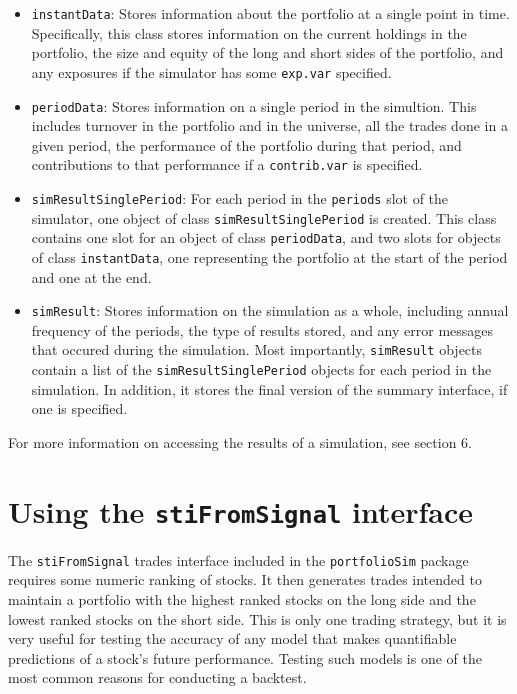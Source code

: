 \documentclass{article}
\begin{document}
\begin{itemize}

\item{\texttt{instantData}}: Stores information about the portfolio at
a single point in time.  Specifically, this class stores information
on the current holdings in the portfolio, the size and equity of the
long and short sides of the portfolio, and any exposures if the
simulator has some \texttt{exp.var} specified.

\item{\texttt{periodData}}: Stores information on a single period in
the simultion.  This includes turnover in the portfolio and in the
universe, all the trades done in a given period, the performance of
the portfolio during that period, and contributions to that
performance if a \texttt{contrib.var} is specified.

\item{\texttt{simResultSinglePeriod}}: For each period in the
\texttt{periods} slot of the simulator, one object of class
\texttt{simResultSinglePeriod} is created.  This class contains one
slot for an object of class \texttt{periodData}, and two slots for
objects of class \texttt{instantData}, one representing the portfolio
at the start of the period and one at the end.

\item{\texttt{simResult}}: Stores information on the simulation as a
whole, including annual frequency of the periods, the type of results
stored, and any error messages that occured during the simulation.
Most importantly, \texttt{simResult} objects contain a list of the
\texttt{simResultSinglePeriod} objects for each period in the
simulation.  In addition, it stores the final version of the summary
interface, if one is specified.

\end{itemize}

For more information on accessing the results of a simulation, see
section 6.


\section{Using the \texttt{stiFromSignal} interface}

The \texttt{stiFromSignal} trades interface included in the
\texttt{portfolioSim} package requires some numeric ranking of stocks.
It then generates trades intended to maintain a portfolio with the
highest ranked stocks on the long side and the lowest ranked stocks on
the short side.  This is only one trading strategy, but it is very
useful for testing the accuracy of any model that makes quantifiable
predictions of a stock's future performance.  Testing such models is
one of the most common reasons for conducting a backtest.
\end{document}
